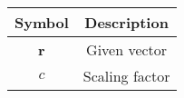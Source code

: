 \begin{tabular}[12pt]{ |c|c|}
    \hline
    \textbf{Symbol} & \textbf{Description} \\
    \hline
    \textbf{r} & Given vector\\
    \hline 
    $c$ & Scaling factor\\
    \hline
    \end{tabular}
